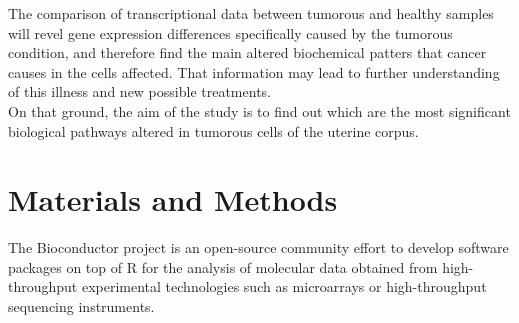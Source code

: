 \documentclass[9pt,twocolumn,twoside]{gsajnl}
\begin{document}
The comparison of transcriptional data between tumorous and healthy samples will revel gene expression differences specifically caused by the tumorous condition, and therefore find the main altered biochemical patters that cancer causes in the cells affected. That information may lead to further understanding of this illness and new possible treatments. \\
\newline
On that ground, the aim of the study is to find out which are the most significant biological pathways altered in tumorous cells of the uterine corpus. 






\section*{Materials and Methods}

The Bioconductor project \citep{Gentleman2004} is an open-source community effort to develop software packages on top of R for the analysis of molecular data obtained from high-throughput experimental technologies such as microarrays or high-throughput sequencing instruments.
\end{document}
